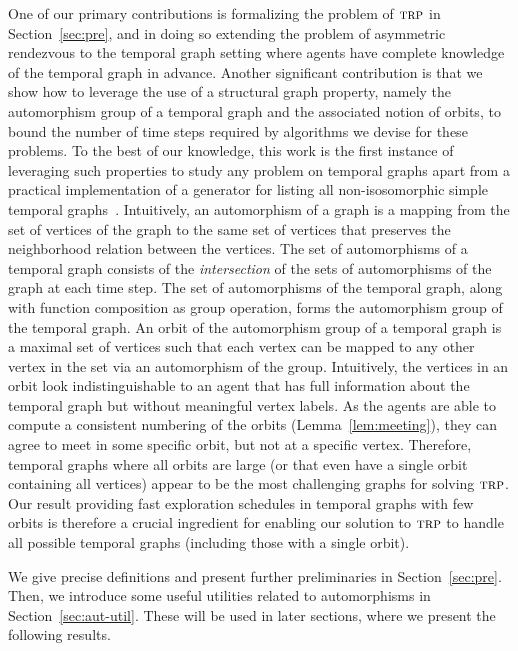 \documentclass[10pt,a4paper]{article}
\newcommand{\trp}{\textsc{trp}}
\newcommand{\texp}{\textsc{texp}}
\begin{document}
One of our primary contributions is formalizing the problem of $\trp$ in
Section~\ref{sec:pre}, and in doing so extending the problem of asymmetric
rendezvous to the temporal graph setting where agents have complete knowledge of
the temporal graph in advance. {Another significant contribution is that we
show} how to leverage the use of a structural graph property, namely the
automorphism group of a temporal
graph and the associated notion of orbits, to bound the number of time steps
required by algorithms we devise for these problems. To the best of our
knowledge, this work is the first instance of leveraging such properties to
study any problem on temporal graphs apart from a practical
implementation of a generator for listing all non-isosomorphic simple temporal
graphs~\cite{Casteigts20}. Intuitively, an automorphism of a graph is a mapping
from the set of vertices of the graph to the same set of vertices that preserves
the
neighborhood relation between the vertices. The set of automorphisms of a temporal graph
consists of the \textit{intersection} of the sets of automorphisms of the
graph at each time step. The set of automorphisms of the temporal graph,
along with function composition as group operation, forms the automorphism group of the
temporal graph. An orbit of the automorphism group of a temporal graph is a maximal set
of vertices such that each vertex can be mapped to any other vertex in the set via
an automorphism of the group.
Intuitively, the vertices in an orbit look indistinguishable
to an agent that has full information about the temporal graph but
without meaningful vertex labels. As the agents are able to compute a
consistent numbering of the orbits (Lemma~\ref{lem:meeting}), they can agree to meet
in some specific orbit, but not at a specific vertex.
{Therefore, temporal graphs where all orbits are large
(or that even have a single orbit containing all vertices)
appear to be the most challenging graphs for solving
$\trp$. Our result providing fast exploration schedules
in temporal graphs with few orbits is therefore a
crucial ingredient for enabling our solution to $\trp$ to handle
all possible temporal graphs (including those with a single
orbit).}


%
%
%

We give precise definitions and present further preliminaries in
Section~\ref{sec:pre}. Then,
we introduce some useful
utilities related to automorphisms in Section~\ref{sec:aut-util}. These
will be used in later sections, where we present the following
results. 
\end{document}
